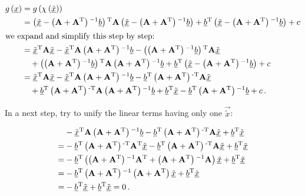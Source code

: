 \documentclass[a4paper,10pt]{article}
\begin{document}
\begin{equation}
\begin{split}
  g\left(\vec{x}\right)
  & =g\left(\chi\left(\vec{\tilde{x}}\right)\right) \\
  & = \left(\vec{\tilde{x}} - \left(\mat{A} + \mat{A}\T\right)\inv \vec{b}\right)\T
      \mat{A}
      \left(\vec{\tilde{x}} - \left(\mat{A} + \mat{A}\T\right)\inv \vec{b}\right)
      + \vec{b}\T \left(\vec{\tilde{x}} - \left(\mat{A} + \mat{A}\T\right)\inv \vec{b}\right)
      + c \\
\intertext{we expand and simplify this step by step:}
  & =   \vec{\tilde{x}}\T \mat{A} \vec{\tilde{x}}
      - \vec{\tilde{x}}\T \mat{A} \left(\mat{A} + \mat{A}\T\right)\inv \vec{b}
      - \left(\left(\mat{A} + \mat{A}\T\right)\inv \vec{b}\right)\T \mat{A} \vec{\tilde{x}} \\
  & \quad
      + \left(\left(\mat{A} + \mat{A}\T\right)\inv \vec{b}\right)\T \mat{A} \left(\mat{A} + \mat{A}\T\right)\inv \vec{b}
      + \vec{b}\T \left(\vec{\tilde{x}} - \left(\mat{A} + \mat{A}\T\right)\inv \vec{b}\right)
      + c \\
  & =   \vec{\tilde{x}}\T \mat{A} \vec{\tilde{x}}
      - \vec{\tilde{x}}\T \mat{A} \left(\mat{A} + \mat{A}\T\right)\inv \vec{b}
      - \vec{b}\T \left(\mat{A} + \mat{A}\T\right)\Tinv \mat{A} \vec{\tilde{x}} \\
  & \quad
      + \vec{b}\T \left(\mat{A} + \mat{A}\T\right)\Tinv \mat{A} \left(\mat{A} + \mat{A}\T\right)\inv \vec{b}
      + \vec{b}\T \vec{\tilde{x}} - \vec{b}\T \left(\mat{A} + \mat{A}\T\right)\inv \vec{b}
      + c \,.
\end{split}
\end{equation}

In a next step, try to unify the linear terms having only one $\vec{\tilde{x}}$:

\begin{equation}
\begin{split}
   &- \vec{\tilde{x}}\T \mat{A} \left(\mat{A} + \mat{A}\T\right)\inv \vec{b}
    - \vec{b}\T \left(\mat{A} + \mat{A}\T\right)\Tinv \mat{A} \vec{\tilde{x}}
    + \vec{b}\T \vec{\tilde{x}} \\
 = &- \vec{b}\T \left(\mat{A} + \mat{A}\T\right)\Tinv \mat{A}\T \vec{\tilde{x}}
    - \vec{b}\T \left(\mat{A} + \mat{A}\T\right)\Tinv \mat{A} \vec{\tilde{x}}
    + \vec{b}\T \vec{\tilde{x}} \\
 = &- \vec{b}\T
      \left(
        \left(\mat{A} + \mat{A}\T\right)\inv \mat{A}\T
      + \left(\mat{A} + \mat{A}\T\right)\inv \mat{A}
      \right)
      \vec{\tilde{x}}
    + \vec{b}\T \vec{\tilde{x}} \\
 = &- \vec{b}\T
      \left(\mat{A} + \mat{A}\T\right)\inv
      \left(\mat{A} + \mat{A}\T\right)
      \vec{\tilde{x}}
    + \vec{b}\T \vec{\tilde{x}} \\
 = &- \vec{b}\T \vec{\tilde{x}}
    + \vec{b}\T \vec{\tilde{x}} = 0 \,.
\end{split}
\end{equation}
\end{document}
